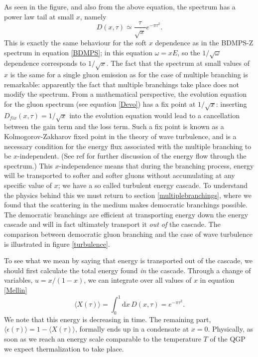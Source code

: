 \documentclass[a4paper,12pt]{article}
\numberwithin{equation}{section}
\begin{document}
As seen in the figure, and also from the above equation, the spectrum has a power law tail at small $x$, namely
\begin{equation}\label{softD}
D(x,\tau)\simeq \frac{\tau}{\sqrt{x}}e^{-\pi\tau^2}.
\end{equation}
This is exactly the same behaviour for the soft $x$ dependence as in the BDMPS-Z spectrum in equation \ref{BDMPS}; in this equation $\omega=xE$, so the $1/\sqrt{\omega}$ dependence corresponds to $1/\sqrt{x}$. The fact that the spectrum at small values of $x$ is the same for a single gluon emission as for the case of multiple branching is remarkable: apparently the fact that multiple branchings take place does not modify the spectrum. From a mathematical perspective, the evolution equation for the gluon spectrum (see equation \eqref{Devo}) has a fix point at $1/\sqrt{x}$: inserting $D_{fix}(x,\tau)=1/\sqrt{x}$ into the evolution equation would lead to a cancellation between the gain term and the loss term\cite{FisterIancu}. 
Such a fix point is known as a Kolmogorov-Zakharov fixed point in the theory of wave turbulence, and is a necessary condition for the energy flux associated with the multiple branching to be $x$-independent. (See ref \cite{FisterIancu} for further discussion of the energy flow through the spectrum.) This $x$-independence means that during the branching process, energy will be transported to softer and softer gluons without accumulating at any specific value of $x$; we have a so called turbulent energy cascade. To understand the physics behind this we must return to section \ref{multiplebranchings}, where we found that the scattering in the medium makes democratic branchings possible. The democratic branchings are efficient at transporting energy down the energy cascade and will in fact ultimately transport it \emph{out of} the cascade. The comparison between democratic gluon branching and the case of wave turbulence is illustrated in figure \ref{turbulence}.



To see what we mean by saying that energy is transported out of the cascade, we should first calculate the total energy found \emph{in} the cascade. Through a change of variables, $u=x/(1-x)$, we can integrate over all values of $x$ in equation \eqref{Mellin}
\begin{equation}\label{X}
\langle X(\tau)\rangle=\int_0^1 \mathrm{d}x\, D(x,\tau) = e^{-\pi\tau^2}.
\end{equation}
We note that this energy is decreasing in time. The remaining part, $\langle \epsilon (\tau) \rangle = 1- \langle X(\tau)\rangle$, formally ends up in a condensate at $x=0$. Physically, as soon as we reach an energy scale comparable to the temperature $T$ of the QGP we expect thermalization to take place.
\end{document}
